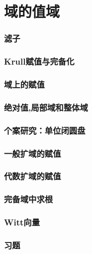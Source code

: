 \chapter{域的值域}

\subsection{滤子}
\subsection{Krull赋值与完备化}
\subsection{域上的赋值}
\subsection{绝对值,局部域和整体域}
\subsection{个案研究：单位闭圆盘}
\subsection{一般扩域的赋值}
\subsection{代数扩域的赋值}
\subsection{完备域中求根}
\subsection{Witt向量}
\subsection{习题}